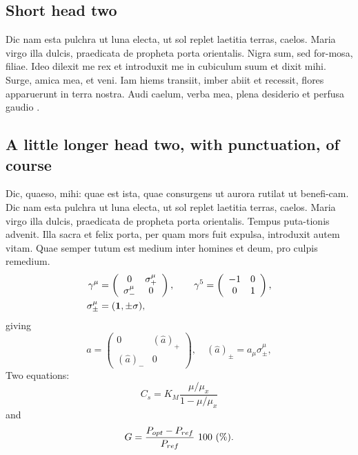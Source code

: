\documentclass{nejsds}
\theoremstyle{remark}
\begin{document}
\subsection{Short head two}

Dic nam esta pulchra ut luna electa, ut sol replet laetitia terras,
caelos. Maria virgo illa dulcis, praedicata de propheta porta
orientalis. Nigra sum, sed for-mosa, filiae. Ideo dilexit me rex et \cite{Anderson}
introduxit me in cubiculum suum et dixit mihi. Surge, amica mea, et
veni. Iam hiems transiit, imber abiit et recessit, flores apparuerunt in
terra nostra. Audi caelum, verba mea, plena desiderio et perfusa gaudio \cite{XiuliChao1999,powergrid1}.

\subsection{A little longer head two, with punctuation, of course}

Dic, quaeso, mihi: quae est ista, quae consurgens ut aurora rutilat
ut benefi-cam.  Dic nam esta pulchra ut luna electa, ut sol replet
laetitia terras, caelos.  Maria virgo illa dulcis, praedicata de
propheta porta orientalis. Tempus puta-tionis advenit. Illa sacra et
felix porta, per quam mors fuit expulsa, introduxit autem vitam. Quae
semper tutum est medium inter homines et deum, pro culpis remedium.
%
\begin{align}
\gamma^\mu & =
\left(
%
\begin{array}{cc}
0            & \sigma^\mu_+ \\
\sigma^\mu_- & 0            
\end{array}
%
\right),
\qquad
\gamma^5= \left(
%
\begin{array}{cc}
-1 & 0 \\
0  & 1
\end{array}
%
\right),\nonumber\\
\sigma^\mu_{\pm} & = ({\bf1} ,\pm\sigma) , \nonumber
\end{align}
%
giving
%
\begin{equation}
\hat a= \left(
%
\begin{array}{cc}
0          & (\hat a)_+ \\
(\hat a)_- & 0
\end{array}
%
\right),\quad(\hat a)_\pm=a_\mu\sigma^\mu_\pm,
\end{equation}
%
Two equations:
%
\begin{equation}
C_{s} = K_{M} \frac{\mu/\mu_{x}}{1-\mu/\mu_{x}} \label{ccs}
\end{equation}
%
and
%
\begin{equation}
G = \frac{P_{\rm opt} - P_{\rm ref}}{P_{\rm ref}}\ 100\ (\%).
\end{equation}
\end{document}
